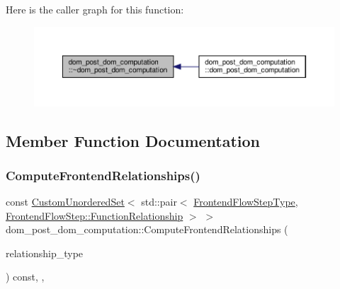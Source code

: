 Here is the caller graph for this function\+:
\nopagebreak
\begin{figure}[H]
\begin{center}
\leavevmode
\includegraphics[width=350pt]{db/d28/classdom__post__dom__computation_a735e5895c025d0edc43db0e9be5c8b8c_icgraph}
\end{center}
\end{figure}


\subsection{Member Function Documentation}
\mbox{\label{classdom__post__dom__computation_a72ef655b3a6a7d4c67c312755033b949}} 
\subsubsection{\texorpdfstring{Compute\+Frontend\+Relationships()}{ComputeFrontendRelationships()}}
{\footnotesize\ttfamily const \hyperlink{classCustomUnorderedSet}{Custom\+Unordered\+Set}$<$ std\+::pair$<$ \hyperlink{frontend__flow__step_8hpp_afeb3716c693d2b2e4ed3e6d04c3b63bb}{Frontend\+Flow\+Step\+Type}, \hyperlink{classFrontendFlowStep_af7cf30f2023e5b99e637dc2058289ab0}{Frontend\+Flow\+Step\+::\+Function\+Relationship} $>$ $>$ dom\+\_\+post\+\_\+dom\+\_\+computation\+::\+Compute\+Frontend\+Relationships (\begin{DoxyParamCaption}\item[{const \hyperlink{classDesignFlowStep_a723a3baf19ff2ceb77bc13e099d0b1b7}{Design\+Flow\+Step\+::\+Relationship\+Type}}]{relationship\+\_\+type }\end{DoxyParamCaption}) const\hspace{0.3cm}{\ttfamily [override]}, {\ttfamily [private]}, {\ttfamily [virtual]}}



